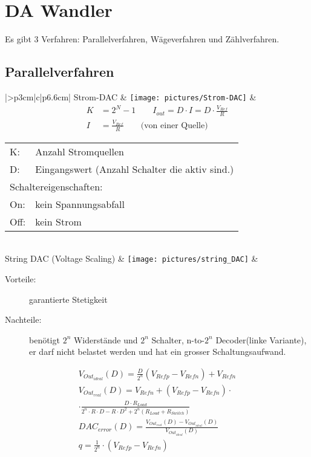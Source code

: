 \section{DA Wandler}
  Es gibt 3 Verfahren: Parallelverfahren, Wägeverfahren und Zählverfahren.

\subsection{Parallelverfahren}

\renewcommand{\arraystretch}{1}
\begin{tabular}{|>{\bfseries}p{3cm}|c|p{6.6cm}|}
	\hline
	Strom-DAC \hartl{456} 
	& \texttt{[image: pictures/Strom-DAC]}
	& {\begin{align*}
      K &=2^N-1 \qquad I_{out} = D \cdot I = D \cdot \frac{V_{Ref}}{R}\\
      I &=\frac{V_{Ref}}{R} \qquad \text{(von einer Quelle)}
	  \end{align*}}
	  \begin{tabular}{lp{5cm}}
	  	K: & Anzahl Stromquellen \\
      D: & Eingangswert (Anzahl Schalter die aktiv sind.) \\
      \multicolumn{2}{l}{Schaltereigenschaften:}\\
      On: & kein Spannungsabfall  \\
      Off: & kein Strom
    \end{tabular} 
	\\ \hline
	String DAC (Voltage Scaling) 
	& \texttt{[image: pictures/string\_DAC]}
	& 
		\begin{description}
  		\item[Vorteile: ] garantierte Stetigkeit
  		\item[Nachteile:] benötigt $2^n$ Widerstände und $2^n$ Schalter, n-to-$2^n$ Decoder(linke Variante),
        er darf nicht belastet werden und hat ein grosser Schaltungsaufwand.
	  \end{description} 
    
	  {\begin{align*}
	  	V_{Out_{ideal}}(D) = \frac{D}{2^n}(V_{Refp}-V_{Refn})+V_{Refn}\\
	  	V_{Out_{real}}(D) = V_{Refn}+\left(V_{Refp}-V_{Refn}\right)\cdot\\
	  		\cdot\frac{D \cdot R_{Load}}{2^n \cdot R \cdot D-R \cdot D^2 + 2^n (R_{Load} + R_{Switch}) }\\
	  	DAC_{error}(D)=\frac{V_{Out_{real}}(D)-V_{Out_{ideal}}(D)}{V_{Out_{ideal}}(D)}\\  q = \frac{1}{2^n} \cdot (V_{Refp}-V_{Refn}) \\
	  \end{align*}}
	  

\end{tabular}
